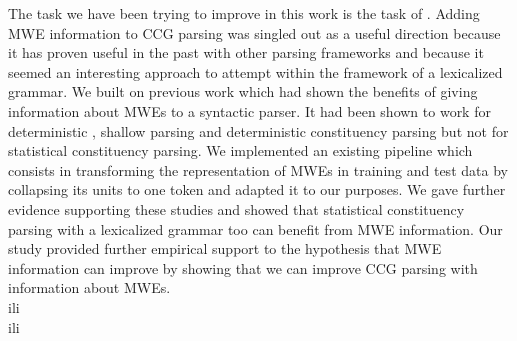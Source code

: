 \documentclass[output=paper]{LSP/langsci}
\begin{document}
{{\ili{}\indent\ili{} The\ili{} task\ili{} we\ili{} have\ili{} been\ili{} trying\ili{} to\ili{} improve\ili{} in\ili{} this\ili{} work\ili{} is\ili{} the\ili{} task\ili{} of\ili{} \ili{}\isi{}\ili{}.\ili{} Adding\ili{} MWE\ili{} information\ili{} to\ili{} CCG\ili{} parsing\ili{} was\ili{} singled\ili{} out\ili{} as\ili{} a\ili{} useful\ili{} direction\ili{} because\ili{} it\ili{} has\ili{} proven\ili{} useful\ili{} in\ili{} the\ili{} past\ili{} with\ili{} other\ili{} parsing\ili{} frameworks\ili{} and\ili{} because\ili{} it\ili{} seemed\ili{} an\ili{} interesting\ili{} approach\ili{} to\ili{} attempt\ili{} within\ili{} the\ili{} framework\ili{} of\ili{} a\ili{} lexicalized\ili{} grammar\ili{}.\ili{} We\ili{} built\ili{} on\ili{} previous\ili{} work\ili{} which\ili{} had\ili{} shown\ili{} the\ili{} benefits\ili{} of\ili{} giving\ili{} information\ili{} about\ili{} MWEs\ili{} to\ili{} a\ili{} syntactic\ili{} parser\ili{}.\ili{} It\ili{} had\ili{} been\ili{} shown\ili{} to\ili{} work\ili{} for\ili{} deterministic\ili{} \ili{}\isi{}\ili{},\ili{} shallow\ili{} parsing\ili{} and\ili{} deterministic\ili{} constituency\ili{} parsing\ili{} but\ili{} not\ili{} for\ili{} statistical\ili{} constituency\ili{} parsing\ili{}.\ili{} We\ili{} implemented\ili{} an\ili{} existing\ili{} pipeline\ili{} which\ili{} consists\ili{} in\ili{} transforming\ili{} the\ili{} representation\ili{} of\ili{} MWEs\ili{} in\ili{} training\ili{} and\ili{} test\ili{} data\ili{} by\ili{} collapsing\ili{} its\ili{} units\ili{} to\ili{} one\ili{} token\ili{} and\ili{} adapted\ili{} it\ili{} to\ili{} our\ili{} purposes\ili{}.\ili{} We\ili{} gave\ili{} further\ili{} evidence\ili{} supporting\ili{} these\ili{} studies\ili{} and\ili{} showed\ili{} that\ili{} statistical\ili{} constituency\ili{} parsing\ili{} with\ili{} a\ili{} lexicalized\ili{} grammar\ili{} too\ili{} can\ili{} benefit\ili{} from\ili{} MWE\ili{} information\ili{}.\ili{} Our\ili{} study\ili{} provided\ili{} further\ili{} empirical\ili{} support\ili{} to\ili{} the\ili{} hypothesis\ili{} that\ili{} MWE\ili{} information\ili{} can\ili{} improve\ili{} \ili{}\isi{}\ili{} by\ili{} showing\ili{} that\ili{} we\ili{} can\ili{} improve\ili{} CCG\ili{} parsing\ili{} with\ili{} information\ili{} about\ili{} MWEs\ili{}.\ili{} \ili{}\\ili{}\\ili{}
}}
\end{document}
